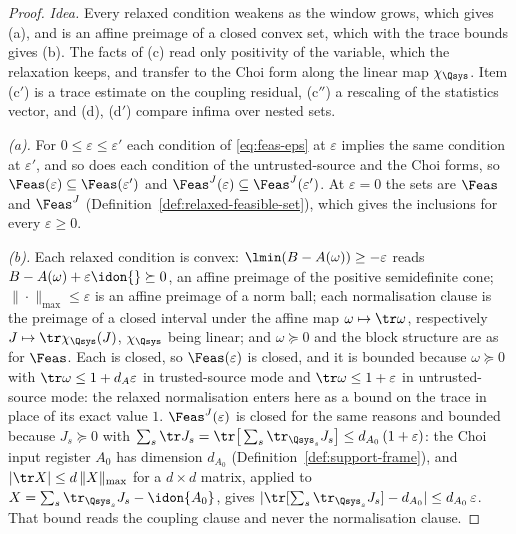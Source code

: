 \begin{proof}
\emph{Idea.} Every relaxed condition weakens as the window grows, which
gives (a), and is an affine preimage of a closed convex set, which with
the trace bounds gives (b). The facts of (c) read only positivity
of the variable, which the relaxation keeps, and transfer to the Choi form
along the linear map $\chi_{\Qsys}$. Item (c$'$) is a trace estimate on the
coupling residual, (c$''$) a rescaling of the statistics vector, and (d),
(d$'$) compare infima over nested sets.

\emph{(a).} For $0\le\varepsilon\le\varepsilon'$ each condition of
\eqref{eq:feas-eps} at $\varepsilon$ implies the same condition at
$\varepsilon'$, and so does each condition of the untrusted-source and the
Choi forms, so $\Feas(\varepsilon)\subseteq\Feas(\varepsilon')$ and
$\Feas^{J}(\varepsilon)\subseteq\Feas^{J}(\varepsilon')$. At
$\varepsilon=0$ the sets are $\Feas$ and $\Feas^{J}$
(Definition~\ref{def:relaxed-feasible-set}), which gives the inclusions
for every $\varepsilon\ge0$.

\emph{(b).} Each relaxed condition is convex:
$\lmin(B-A(\omega))\ge-\varepsilon$ reads
$B-A(\omega)+\varepsilon\idon{}\succeq0$, an affine preimage of the
positive semidefinite cone; $\|\cdot\|_{\max}\le\varepsilon$ is an affine
preimage of a norm ball; each normalisation clause is the preimage of a
closed interval under the affine map $\omega\mapsto\tr\omega$,
respectively $J\mapsto\tr\chi_{\Qsys}(J)$, $\chi_{\Qsys}$ being linear;
and $\omega\succeq0$ and the block structure are as for $\Feas$. Each is
closed, so $\Feas(\varepsilon)$ is closed, and it is bounded because
$\omega\succeq0$ with $\tr\omega\le1+d_A\varepsilon$ in trusted-source
mode and $\tr\omega\le1+\varepsilon$ in untrusted-source mode: the relaxed
normalisation enters here as a bound on the trace in place of its exact
value $1$. $\Feas^{J}(\varepsilon)$ is closed for the same reasons and
bounded because $J_s\succeq0$ with
$\sum_s\tr J_s=\tr\big[\sum_s\tr_{\Qsys_s}J_s\big]
\le d_{A_0}\,(1+\varepsilon)$: the Choi input register $A_0$ has dimension
$d_{A_0}$ (Definition~\ref{def:support-frame}), and
$|\tr X|\le d\,\|X\|_{\max}$ for a $d\times d$ matrix, applied to
$X=\sum_s\tr_{\Qsys_s}J_s-\idon{A_0}$, gives
$|\tr[\sum_s\tr_{\Qsys_s}J_s]-d_{A_0}|\le d_{A_0}\,\varepsilon$. That
bound reads the coupling clause and never the normalisation clause.


\end{proof}
